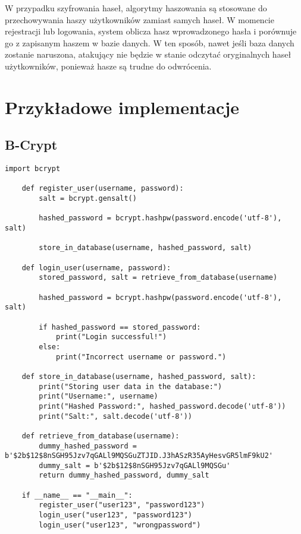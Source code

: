 \documentclass{article}
\begin{document}
    W przypadku szyfrowania haseł, algorytmy haszowania są stosowane do przechowywania haszy użytkowników zamiast samych haseł. W momencie rejestracji lub logowania, system oblicza hasz wprowadzonego hasła i porównuje go z zapisanym haszem w bazie danych. W ten sposób, nawet jeśli baza danych zostanie naruszona, atakujący nie będzie w stanie odczytać oryginalnych haseł użytkowników, ponieważ hasze są trudne do odwrócenia.

\section{Przykładowe implementacje}
\subsection*{B-Crypt}
\begin{lstlisting}[style=pythonstyle]
    import bcrypt

    def register_user(username, password):
        salt = bcrypt.gensalt()
    
        hashed_password = bcrypt.hashpw(password.encode('utf-8'), salt)

        store_in_database(username, hashed_password, salt)
    
    def login_user(username, password):
        stored_password, salt = retrieve_from_database(username)

        hashed_password = bcrypt.hashpw(password.encode('utf-8'), salt)
    
        if hashed_password == stored_password:
            print("Login successful!")
        else:
            print("Incorrect username or password.")
    
    def store_in_database(username, hashed_password, salt):
        print("Storing user data in the database:")
        print("Username:", username)
        print("Hashed Password:", hashed_password.decode('utf-8'))
        print("Salt:", salt.decode('utf-8'))
    
    def retrieve_from_database(username):
        dummy_hashed_password = b'$2b$12$8nSGH95Jzv7qGALl9MQSGuZTJID.J3hASzR35AyHesvGR5lmF9kU2'
        dummy_salt = b'$2b$12$8nSGH95Jzv7qGALl9MQSGu'
        return dummy_hashed_password, dummy_salt
    
    if __name__ == "__main__":
        register_user("user123", "password123")
        login_user("user123", "password123")
        login_user("user123", "wrongpassword")
    \end{lstlisting}
\end{document}
